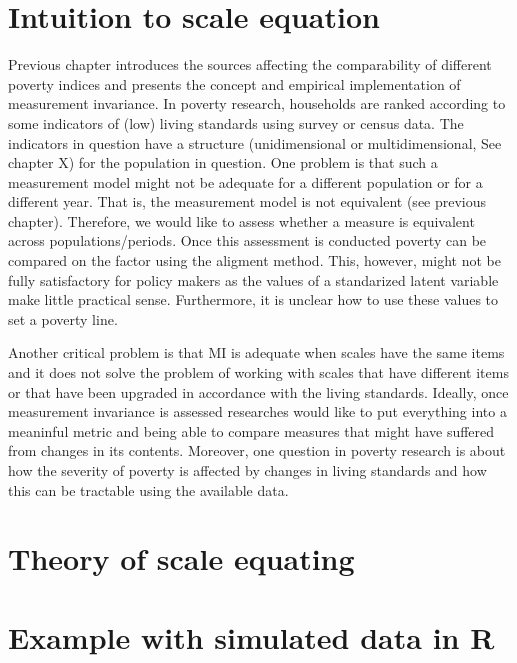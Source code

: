 \documentclass[]{book}
\begin{document}
\hypertarget{intuition-to-scale-equation}{%
\section{Intuition to scale equation}\label{intuition-to-scale-equation}}

Previous chapter introduces the sources affecting the comparability of different poverty indices and presents the concept and empirical implementation of measurement invariance. In poverty research, households are ranked according to some indicators of (low) living standards using survey or census data. The indicators in question have a structure (unidimensional or multidimensional, See chapter X) for the population in question. One problem is that such a measurement model might not be adequate for a different population or for a different year. That is, the measurement model is not equivalent (see previous chapter). Therefore, we would like to assess whether a measure is equivalent across populations/periods. Once this assessment is conducted poverty can be compared on the factor using the aligment method. This, however, might not be fully satisfactory for policy makers as the values of a standarized latent variable make little practical sense. Furthermore, it is unclear how to use these values to set a poverty line.

Another critical problem is that MI is adequate when scales have the same items and it does not solve the problem of working with scales that have different items or that have been upgraded in accordance with the living standards. Ideally, once measurement invariance is assessed researches would like to put everything into a meaninful metric and being able to compare measures that might have suffered from changes in its contents. Moreover, one question in poverty research is about how the severity of poverty is affected by changes in living standards and how this can be tractable using the available data.

\hypertarget{theory-of-scale-equating}{%
\section{Theory of scale equating}\label{theory-of-scale-equating}}

\hypertarget{example-with-simulated-data-in-r}{%
\section{Example with simulated data in R}\label{example-with-simulated-data-in-r}}
\end{document}
